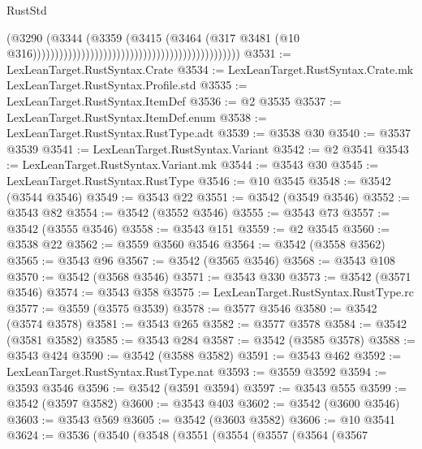 \begin{lexlean}{RustStd}
\begin{coremodule}
{\begin{coremodule}
{{{{{{{{{{{{{{{{{{{{{{{{{{{{{{{{{{{{{{{{{{{{{{{{{{                                                                                    (@3290
                                                                                      (@3344
                                                                                        (@3359
                                                                                          (@3415
                                                                                            (@3464
                                                                                              (@317
                                                                                                @3481
                                                                                                (@10
                                                                                                  @316)))))))))))))))))))))))))))))))))))))))))))))))
@3531 := LexLeanTarget.RustSyntax.Crate
@3534 := LexLeanTarget.RustSyntax.Crate.mk LexLeanTarget.RustSyntax.Profile.std
@3535 := LexLeanTarget.RustSyntax.ItemDef
@3536 := @2 @3535
@3537 := LexLeanTarget.RustSyntax.ItemDef.enum
@3538 := LexLeanTarget.RustSyntax.RustType.adt
@3539 := @3538 @30
@3540 := @3537 @3539
@3541 := LexLeanTarget.RustSyntax.Variant
@3542 := @2 @3541
@3543 := LexLeanTarget.RustSyntax.Variant.mk
@3544 := @3543 @30
@3545 := LexLeanTarget.RustSyntax.RustType
@3546 := @10 @3545
@3548 := @3542 (@3544 @3546)
@3549 := @3543 @22
@3551 := @3542 (@3549 @3546)
@3552 := @3543 @82
@3554 := @3542 (@3552 @3546)
@3555 := @3543 @73
@3557 := @3542 (@3555 @3546)
@3558 := @3543 @151
@3559 := @2 @3545
@3560 := @3538 @22
@3562 := @3559 @3560 @3546
@3564 := @3542 (@3558 @3562)
@3565 := @3543 @96
@3567 := @3542 (@3565 @3546)
@3568 := @3543 @108
@3570 := @3542 (@3568 @3546)
@3571 := @3543 @330
@3573 := @3542 (@3571 @3546)
@3574 := @3543 @358
@3575 := LexLeanTarget.RustSyntax.RustType.rc
@3577 := @3559 (@3575 @3539)
@3578 := @3577 @3546
@3580 := @3542 (@3574 @3578)
@3581 := @3543 @265
@3582 := @3577 @3578
@3584 := @3542 (@3581 @3582)
@3585 := @3543 @284
@3587 := @3542 (@3585 @3578)
@3588 := @3543 @424
@3590 := @3542 (@3588 @3582)
@3591 := @3543 @462
@3592 := LexLeanTarget.RustSyntax.RustType.nat
@3593 := @3559 @3592
@3594 := @3593 @3546
@3596 := @3542 (@3591 @3594)
@3597 := @3543 @555
@3599 := @3542 (@3597 @3582)
@3600 := @3543 @403
@3602 := @3542 (@3600 @3546)
@3603 := @3543 @569
@3605 := @3542 (@3603 @3582)
@3606 := @10 @3541
@3624 := @3536
    (@3540
      (@3548
        (@3551
          (@3554
            (@3557
              (@3564
                (@3567
}}}}}}}}}}}}}}}}}}}}}}}}}}}}}}}}}}}}}}}}}}}}}}}}}}
\end{coremodule}}
\end{coremodule}
\end{lexlean}
